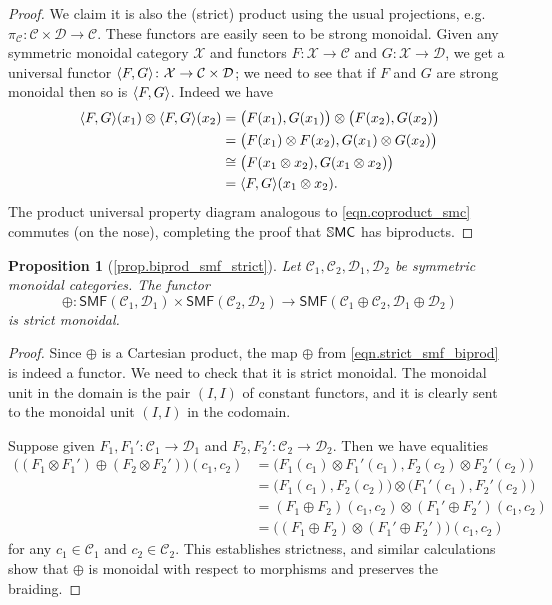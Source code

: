 \documentclass[11pt, oneside, article]{memoir}
\theoremstyle{plain}
\newtheorem*{proposition*}{Proposition}
\theoremstyle{definition}
\theoremstyle{remark}
\newcommand{\cat}[1]{\mathcal{#1}}%
\newcommand{\Cat}[1]{{\mathsf{#1}}}%
\newcommand{\CCat}[1]{\mathbb{\StrLeft{#1}{1}}\Cat{\StrGobbleLeft{#1}{1}}}%
\DeclarePairedDelimiter{\pair}{\langle}{\rangle}
\newcommand{\smf}{\Cat{SMF}}
\newcommand{\ssmc}{\CCat{SMC}}
\begin{document}
\begin{proof}
We claim it is also the (strict) product using the usual projections, e.g.\ $\pi_{\cat{C}}\colon\cat{C}\times\cat{D}\to\cat{C}$. These functors are easily seen to be strong monoidal. Given any symmetric monoidal category $\cat{X}$ and functors $F\colon\cat{X}\to\cat{C}$ and $G\colon\cat{X}\to\cat{D}$, we get a universal functor $\pair{F,G}\colon\cat{X}\to\cat{C}\times\cat{D}$; we need to see that if $F$ and $G$ are strong monoidal then so is $\pair{F,G}$. Indeed we have
\begin{align*}
	\pair{F,G}(x_1)\otimes\pair{F,G}(x_2)&=
	\big(F(x_1),G(x_1)\big)\otimes\big(F(x_2),G(x_2)\big)\\&=
	\big(F(x_1)\otimes F(x_2),G(x_1)\otimes G(x_2)\big)\\&\cong
	\big(F(x_1\otimes x_2),G(x_1\otimes x_2)\big)\\&=
	\pair{F,G}(x_1\otimes x_2).
\end{align*}
The product universal property diagram analogous to \cref{eqn.coproduct_smc} commutes (on the nose), completing the proof that $\ssmc$ has biproducts.
\end{proof}

\begin{proposition*}[\ref{prop.biprod_smf_strict}]\label{page.biprod_smf_strict}
Let $\cat{C}_1,\cat{C}_2,\cat{D}_1,\cat{D}_2$ be symmetric monoidal categories. The functor
\begin{equation}\label{eqn.strict_smf_biprod}\oplus\colon\smf(\cat{C}_1,\cat{D}_1)\times\smf(\cat{C}_2,\cat{D}_2)\to\smf(\cat{C}_1\oplus\cat{C}_2,\cat{D}_1\oplus\cat{D}_2)
\end{equation}
is strict monoidal.
\end{proposition*}
\begin{proof}
Since $\oplus$ is a Cartesian product, the map $\oplus$ from \cref{eqn.strict_smf_biprod} is indeed a functor. We need to check that it is strict monoidal. The monoidal unit in the domain is the pair $(I,I)$ of constant functors, and it is clearly sent to the monoidal unit $(I,I)$ in the codomain.

Suppose given $F_1, F_1'\colon\cat{C}_1\to\cat{D}_1$ and $F_2,F_2'\colon\cat{C}_2\to\cat{D}_2$. Then we have equalities
\begin{align*}
	\big((F_1\otimes F_1')\oplus(F_2\otimes F_2')\big)(c_1,c_2)&=
	\big(F_1(c_1)\otimes F_1'(c_1),F_2(c_2)\otimes F_2'(c_2)\big)\\&=
	\big(F_1(c_1),F_2(c_2)\big)\otimes\big(F_1'(c_1),F_2'(c_2)\big)\\&=
	(F_1\oplus F_2)(c_1,c_2)\otimes(F_1'\oplus F_2')(c_1,c_2)\\&=
	\big((F_1\oplus F_2)\otimes(F_1'\oplus F_2')\big)(c_1,c_2)
\end{align*}
for any $c_1\in\cat{C}_1$ and $c_2\in\cat{C}_2$. This establishes strictness, and similar calculations show that $\oplus$ is monoidal with respect to morphisms and preserves the braiding. 
\end{proof}
\end{document}
